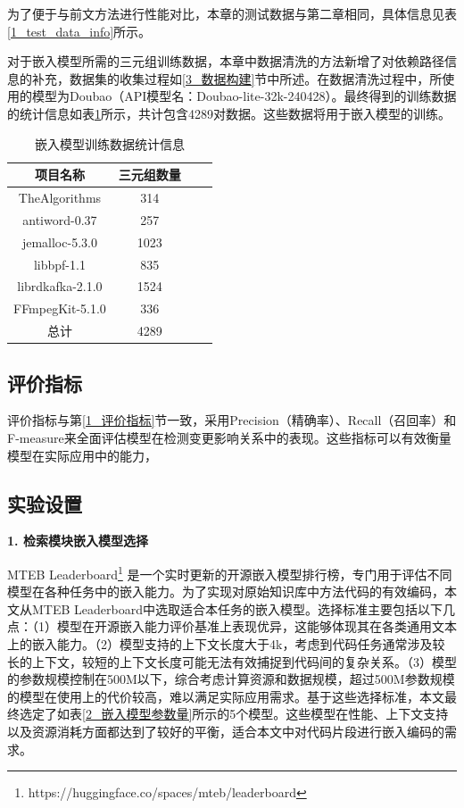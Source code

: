 为了便于与前文方法进行性能对比，本章的测试数据与第二章相同，具体信息见表\ref{1_test_data_info}所示。

对于嵌入模型所需的三元组训练数据，本章中数据清洗的方法新增了对依赖路径信息的补充，数据集的收集过程如\ref{3_数据构建}节中所述。在数据清洗过程中，所使用的模型为Doubao（API模型名：Doubao-lite-32k-240428）。最终得到的训练数据的统计信息如表\ref{1_数据集统计信息}所示，共计包含4289对数据。这些数据将用于嵌入模型的训练。


\begin{table}[htbp]
\caption{嵌入模型训练数据统计信息}
\label{1_数据集统计信息}
\vspace{0.5em}\centering\wuhao
\begin{tabular}{cccc}
\toprule
项目名称 & 三元组数量 \\
\midrule
TheAlgorithms    & 314   \\
antiword-0.37    & 257   \\
jemalloc-5.3.0   & 1023   \\
libbpf-1.1       & 835   \\
librdkafka-2.1.0 & 1524  \\
FFmpegKit-5.1.0  & 336   \\ 
总计              & 4289  \\
\bottomrule
\end{tabular}
\end{table}

\subsection{评价指标} 

评价指标与第\ref{1_评价指标}节一致，采用Precision（精确率）、Recall（召回率）和F-measure来全面评估模型在检测变更影响关系中的表现。这些指标可以有效衡量模型在实际应用中的能力，

\subsection{实验设置}

\noindent \textbf{1. 检索模块嵌入模型选择}

MTEB Leaderboard\footnote{https://huggingface.co/spaces/mteb/leaderboard} 是一个实时更新的开源嵌入模型排行榜，专门用于评估不同模型在各种任务中的嵌入能力。为了实现对原始知识库中方法代码的有效编码，本文从MTEB Leaderboard中选取适合本任务的嵌入模型。选择标准主要包括以下几点：（1）模型在开源嵌入能力评价基准上表现优异，这能够体现其在各类通用文本上的嵌入能力。（2）模型支持的上下文长度大于4k，考虑到代码任务通常涉及较长的上下文，较短的上下文长度可能无法有效捕捉到代码间的复杂关系。（3）模型的参数规模控制在500M以下，综合考虑计算资源和数据规模，超过500M参数规模的模型在使用上的代价较高，难以满足实际应用需求。基于这些选择标准，本文最终选定了如表\ref{2_嵌入模型参数量}所示的5个模型。这些模型在性能、上下文支持以及资源消耗方面都达到了较好的平衡，适合本文中对代码片段进行嵌入编码的需求。
    
